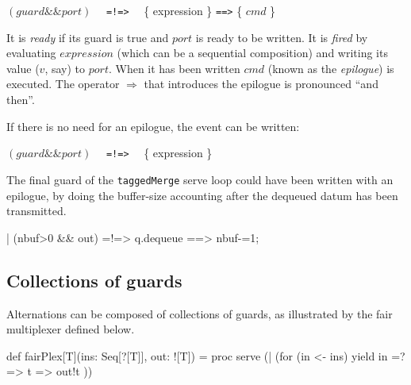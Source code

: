 \documentclass[12pt]{IOS-Book-Article-CPA-2017}
\def\AND{\mathtt{\&\&}}
\begin{document}
\begin{center}
\((guard \AND port)\) ~~\verb/=!=>/~~ \{ expression \} \verb/==>/ \{ \(cmd\) \} 
\end{center}


It is \textit{ready} if its guard is true and $port$ is ready to be written.
It is \textit{fired} by evaluating $expression$ (which can be a sequential composition) 
and writing its value ($v$, say) to $port$.  
When it has been written $cmd$ (known as the \textit{epilogue}) is executed.\note
{The operator $\Longrightarrow$ that introduces the {epilogue} is pronounced ``and then''.}

If there is no need for an epilogue, the event can be written:
\begin{center}
\((guard \AND port)\) ~~\verb/=!=>/~~ \{ expression \}
\end{center}
The final guard of the \verb/taggedMerge/ serve loop could have been written with an epilogue, by
doing the buffer-size accounting after the dequeued datum has been transmitted.
\begin{code+}[...]{}
          | (nbuf>0  && out) =!=> { q.dequeue } ==> { nbuf-=1; }
\end{code+}

\subsection{Collections of guards}
Alternations can
be composed of collections of guards, as illustrated 
by the fair multiplexer defined below.
\begin{code*}[fairPlex.scala]
import ox.CSO._
object fairPlex
{
\end{code*}
\label{scalafairplex}
\begin{code+}{}
  def fairPlex[T](ins: Seq[?[T]], out: ![T]) = 
      proc { serve (| (for (in <- ins) yield in =?=> { t => out!t })) }
\end{code+}
\begin{code*}[]
}
\end{code*}
\end{document}
